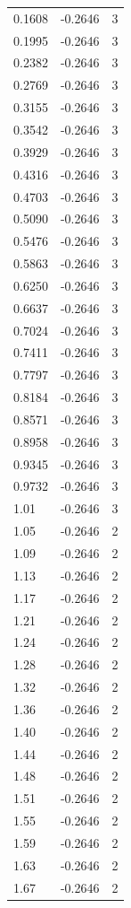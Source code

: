 \begin{longtable}{lrr}
  0.1608 & -0.2646 & 3 \\
  0.1995 & -0.2646 & 3 \\
  0.2382 & -0.2646 & 3 \\
  0.2769 & -0.2646 & 3 \\
  0.3155 & -0.2646 & 3 \\
  0.3542 & -0.2646 & 3 \\
  0.3929 & -0.2646 & 3 \\
  0.4316 & -0.2646 & 3 \\
  0.4703 & -0.2646 & 3 \\
  0.5090 & -0.2646 & 3 \\
  0.5476 & -0.2646 & 3 \\
  0.5863 & -0.2646 & 3 \\
  0.6250 & -0.2646 & 3 \\
  0.6637 & -0.2646 & 3 \\
  0.7024 & -0.2646 & 3 \\
  0.7411 & -0.2646 & 3 \\
  0.7797 & -0.2646 & 3 \\
  0.8184 & -0.2646 & 3 \\
  0.8571 & -0.2646 & 3 \\
  0.8958 & -0.2646 & 3 \\
  0.9345 & -0.2646 & 3 \\
  0.9732 & -0.2646 & 3 \\
  1.01 & -0.2646 & 3 \\
  1.05 & -0.2646 & 2 \\
  1.09 & -0.2646 & 2 \\
  1.13 & -0.2646 & 2 \\
  1.17 & -0.2646 & 2 \\
  1.21 & -0.2646 & 2 \\
  1.24 & -0.2646 & 2 \\
  1.28 & -0.2646 & 2 \\
  1.32 & -0.2646 & 2 \\
  1.36 & -0.2646 & 2 \\
  1.40 & -0.2646 & 2 \\
  1.44 & -0.2646 & 2 \\
  1.48 & -0.2646 & 2 \\
  1.51 & -0.2646 & 2 \\
  1.55 & -0.2646 & 2 \\
  1.59 & -0.2646 & 2 \\
  1.63 & -0.2646 & 2 \\
  1.67 & -0.2646 & 2 \\

\end{longtable}
